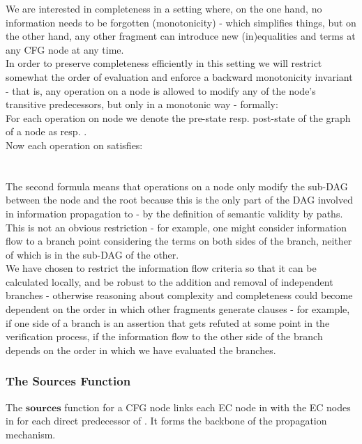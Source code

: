 We are interested in completeness in a setting where, on the one hand, no information needs to be forgotten (monotonicity) - which simplifies things, but on the other hand, any other fragment can introduce new (in)equalities and terms at any CFG node at any time.\\
In order to preserve completeness efficiently in this setting we will restrict somewhat the order of evaluation and enforce a backward monotonicity invariant - that is, any operation on a node is allowed to modify any of the node's transitive predecessors, but only in a monotonic way - formally:\\
For each operation on node  we denote the pre-state resp. post-state of the graph of a node  as 
 resp. . \\
Now each operation on  satisfies:\\
\\
\\
The second formula means that operations on a node  only modify the sub-DAG between the node and the root because this is the only part of the DAG involved in information propagation to  - by the definition of semantic validity by paths.\\
This is not an obvious restriction - for example, one might consider information flow to a branch point considering the terms on both sides of the branch, neither of which is in the sub-DAG of the other. \\
We have chosen to restrict the information flow criteria so that it can be calculated locally, and be robust to the addition and removal of independent branches - otherwise reasoning about complexity and completeness could become dependent on the order in which other fragments generate clauses - for example, if one side of a branch is an assertion that gets refuted at some point in the verification process, if the information flow to the other side of the branch depends on the order in which we have evaluated the branches.

\subsubsection{The Sources Function}
The $\mathbf{sources}$ function for a CFG node  links each EC node in  with the EC nodes in  for each direct predecessor  of . It forms the backbone of the propagation mechanism.

